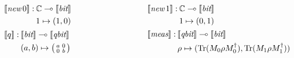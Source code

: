 \begin{figure}[H]
  \begin{equation*}
  \begin{split}
  \begin{aligned}
  &
  \hspace{10pt}
  \begin{minipage}[t]{0.45\textwidth}
  $\begin{aligned}
    [\![\textit{new} \, 0 ]\!] : \hspace{2pt}& \mathbb{C} \multimap \llbracket \textit{bit} \rrbracket  \\
  & 1 \mapsto (1,0) 
  \end{aligned}$
  \end{minipage}
  \hspace{20pt}
  \begin{minipage}[t]{0.45\textwidth}
  $\begin{aligned}
    [\![\textit{new} \, 1 ]\!] :\hspace{2pt}& \mathbb{C} \multimap \llbracket \textit{bit} \rrbracket  \\
    & 1 \mapsto (0,1)
  \end{aligned}$
  \end{minipage} \\
  &
\begin{minipage}[t]{0.45\textwidth}
  $\begin{aligned}
    \hspace{10pt}
    [\![q ]\!] : \hspace{2pt}&\llbracket \textit{bit} \rrbracket \multimap \llbracket \textit{qbit} \rrbracket\\
     &(a,b) \mapsto \big(\begin{smallmatrix}
    a & 0\\
    0 & b
  \end{smallmatrix}\big) 
  \end{aligned}$
  \end{minipage} 
  \hspace{30pt}
\begin{minipage}[t]{0.45\textwidth}
  $\begin{aligned}
    [\![\textit{meas}]\!]:\hspace{2pt} & \llbracket \textit{qbit} \rrbracket \multimap \llbracket \textit{bit} \rrbracket  \\
    &\rho \mapsto ( \text{Tr} (M_{0} \rho M_{0}^{\dag}), \text{Tr} (M_{1} \rho M_{1}^{\dag}))
  \end{aligned}$
  \end{minipage}  

\end{aligned}
\end{split}
\end{equation*}
\end{figure}
